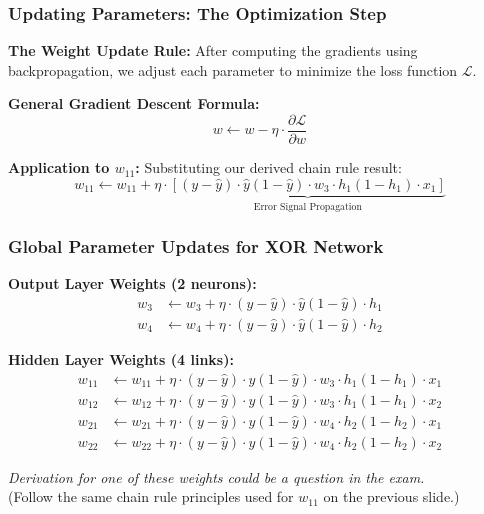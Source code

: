 \documentclass[5pt,aspectratio=169]{beamer}
\begin{document}
\begin{frame}
\frametitle{Updating Parameters: The Optimization Step}

\textbf{The Weight Update Rule:}
After computing the gradients using backpropagation, we adjust each parameter to minimize the loss function $\mathcal{L}$.

\textbf{General Gradient Descent Formula:}
\[
w \leftarrow w - \eta \cdot \frac{\partial \mathcal{L}}{\partial w}
\]

\textbf{Application to $w_{11}$:}
Substituting our derived chain rule result:
\[
w_{11} \leftarrow w_{11} + \eta \cdot \underbrace{\left[ (y - \hat{y}) \cdot \hat{y}(1-\hat{y}) \cdot w_3 \cdot h_1(1-h_1) \cdot x_1 \right]}_{\text{Error Signal Propagation}}
\]

\end{frame}

\begin{frame}
\frametitle{Global Parameter Updates for XOR Network}

{\footnotesize
\textbf{Output Layer Weights (2 neurons):}
\begin{align*}
w_3 &\leftarrow w_3 + \eta \cdot (y - \hat{y}) \cdot \hat{y}(1-\hat{y}) \cdot h_1 \\
w_4 &\leftarrow w_4 + \eta \cdot (y - \hat{y}) \cdot \hat{y}(1-\hat{y}) \cdot h_2
\end{align*}

\textbf{Hidden Layer Weights (4 links):}
\begin{align*}
w_{11} &\leftarrow w_{11} + \eta \cdot (y - \hat{y}) \cdot \hat{y}(1-\hat{y}) \cdot w_3 \cdot h_1(1-h_1) \cdot x_1 \\
w_{12} &\leftarrow w_{12} + \eta \cdot (y - \hat{y}) \cdot \hat{y}(1-\hat{y}) \cdot w_3 \cdot h_1(1-h_1) \cdot x_2 \\
w_{21} &\leftarrow w_{21} + \eta \cdot (y - \hat{y}) \cdot \hat{y}(1-\hat{y}) \cdot w_4 \cdot h_2(1-h_2) \cdot x_1 \\
w_{22} &\leftarrow w_{22} + \eta \cdot (y - \hat{y}) \cdot \hat{y}(1-\hat{y}) \cdot w_4 \cdot h_2(1-h_2) \cdot x_2
\end{align*}
}

\vfill
{\footnotesize
\textit{Derivation for one of these weights could be a question in the exam.} \\
(Follow the same chain rule principles used for $w_{11}$ on the previous slide.)
}
\end{frame}
\end{document}
